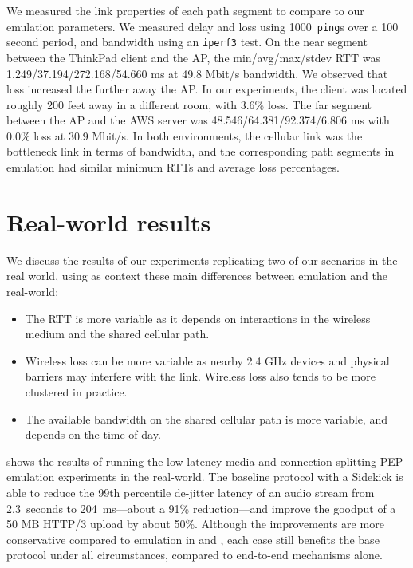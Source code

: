 We measured the link properties of each path segment to compare to
our emulation parameters. We measured delay and loss using 1000~\texttt{ping}s
over a 100 second period, and bandwidth using an \texttt{iperf3} test.
On the near segment between the ThinkPad client and the AP,
the min/avg/max/stdev RTT was 1.249/37.194/272.168/54.660 ms
at 49.8 Mbit/s bandwidth. We observed that loss increased
the further away the AP. In our experiments, the client was located roughly
200 feet away in a different room, with 3.6\% loss.
The far segment between the AP and the AWS server was
48.546/64.381/92.374/6.806 ms with 0.0\% loss at 30.9 Mbit/s.
In both environments, the cellular link was the bottleneck link in terms of
bandwidth, and the corresponding path segments in emulation had similar
minimum RTTs and average loss percentages.

\section{Real-world results}
\label{sec:sidekick:real-world}



We discuss the results of our experiments replicating two of our scenarios in
the real world, using as context
these main differences between emulation and the real-world:

\begin{itemize}[noitemsep,topsep=0pt]
  \item The RTT is more variable as it depends on interactions in the
  wireless medium and the shared cellular path.
  \item Wireless loss can be more variable as nearby 2.4 GHz devices and
  physical barriers may interfere with the link. Wireless loss also tends
  to be more clustered in practice.
  \item The available bandwidth on the shared cellular path is more variable,
  and depends on the time of day.
\end{itemize}

 shows the results of running the low-latency media and
connection-splitting PEP emulation experiments in the real-world. The baseline
protocol with a Sidekick is able to
reduce the 99th percentile de-jitter latency of an audio stream
from 2.3~seconds to 204~ms---about a 91\% reduction---and
improve the goodput of a 50 MB HTTP/3 upload by about 50\%.
Although the improvements are more conservative compared to emulation in
 and
, each case still benefits the
base protocol under all circumstances, compared to end-to-end mechanisms alone.

